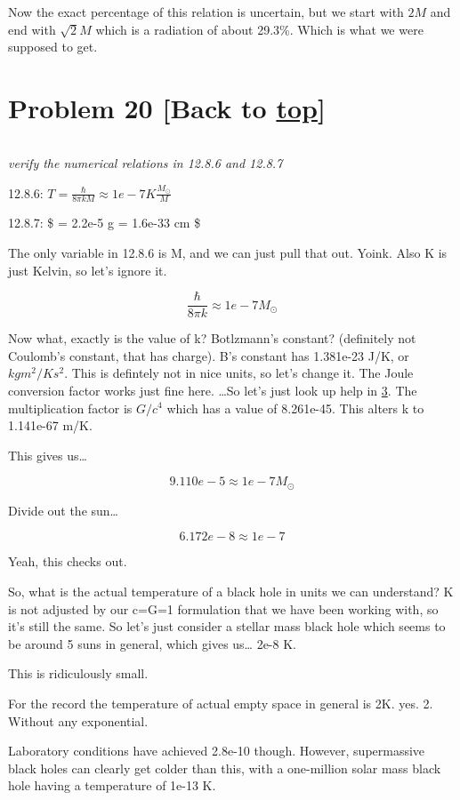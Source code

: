 \documentclass[landscape,letterpaper,10pt,english]{article}
\begin{document}
Now the exact percentage of this relation is uncertain, but we start
with \(2M\) and end with \(\sqrt{2}M\) which is a radiation of about
29.3\%. Which is what we were supposed to get.

    \hypertarget{problem-20-back-to-top}{%
\section{\texorpdfstring{Problem 20 {[}Back to
\hyperref[toc]{top}{]}}{Problem 20 {[}Back to {]}}}\label{problem-20-back-to-top}}

\[\label{P20}\]

\emph{verify the numerical relations in 12.8.6 and 12.8.7}

12.8.6: \(T = \frac{\hbar}{8\pi k M} \approx 1e-7 K \frac{M_\odot}{M}\)

12.8.7: \$ \sqrt{\hbar} = 2.2e-5 g = 1.6e-33 cm \$

    The only variable in 12.8.6 is M, and we can just pull that out. Yoink.
Also K is just Kelvin, so let's ignore it.

\[ \frac{\hbar}{8\pi k} \approx 1e-7 M_\odot\]

Now what, exactly is the value of k? Botlzmann's constant? (definitely
not Coulomb's constant, that has charge). B's constant has 1.381e-23
J/K, or \(kgm^2/Ks^2\). This is defintely not in nice units, so let's
change it. The Joule conversion factor works just fine here. \ldots So
let's just look up help in \hyperref[3]{3}. The multiplication factor is
\(G/c^4\) which has a value of 8.261e-45. This alters k to 1.141e-67
m/K.

This gives us\ldots{}

\[ 9.110e-5 \approx 1e-7 M_\odot\]

Divide out the sun\ldots{}

\[ 6.172e-8 \approx 1e-7 \]

Yeah, this checks out.

    So, what is the actual temperature of a black hole in units we can
understand? K is not adjusted by our c=G=1 formulation that we have been
working with, so it's still the same. So let's just consider a stellar
mass black hole which seems to be around 5 suns in general, which gives
us\ldots{} 2e-8 K.

This is ridiculously small.

For the record the temperature of actual empty space in general is 2K.
yes. 2. Without any exponential.

Laboratory conditions have achieved 2.8e-10 though. However,
supermassive black holes can clearly get colder than this, with a
one-million solar mass black hole having a temperature of 1e-13 K.
\end{document}
